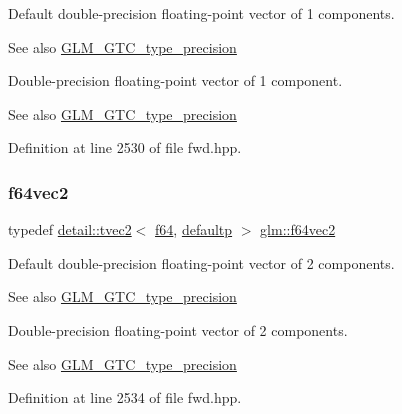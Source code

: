 Default double-\/precision floating-\/point vector of 1 components. \begin{DoxySeeAlso}{See also}
\hyperlink{group__gtc__type__precision}{G\+L\+M\+\_\+\+G\+T\+C\+\_\+type\+\_\+precision}
\end{DoxySeeAlso}
Double-\/precision floating-\/point vector of 1 component. \begin{DoxySeeAlso}{See also}
\hyperlink{group__gtc__type__precision}{G\+L\+M\+\_\+\+G\+T\+C\+\_\+type\+\_\+precision} 
\end{DoxySeeAlso}


Definition at line 2530 of file fwd.\+hpp.

\mbox{\label{group__gtc__type__precision_ga3f131d462df8154918f93ba1ac7cc4bd}} 
\subsubsection{\texorpdfstring{f64vec2}{f64vec2}}
{\footnotesize\ttfamily typedef \hyperlink{structglm_1_1detail_1_1tvec2}{detail\+::tvec2}$<$ \hyperlink{group__gtc__type__precision_ga2bba392e555124b36cde6abba349bab3}{f64}, \hyperlink{namespaceglm_a0f04f086094c747d227af4425893f545a9d21ccd8b5a009ec7eb7677befc3bf51}{defaultp} $>$ \hyperlink{group__gtc__type__precision_ga3f131d462df8154918f93ba1ac7cc4bd}{glm\+::f64vec2}}

Default double-\/precision floating-\/point vector of 2 components. \begin{DoxySeeAlso}{See also}
\hyperlink{group__gtc__type__precision}{G\+L\+M\+\_\+\+G\+T\+C\+\_\+type\+\_\+precision}
\end{DoxySeeAlso}
Double-\/precision floating-\/point vector of 2 components. \begin{DoxySeeAlso}{See also}
\hyperlink{group__gtc__type__precision}{G\+L\+M\+\_\+\+G\+T\+C\+\_\+type\+\_\+precision} 
\end{DoxySeeAlso}


Definition at line 2534 of file fwd.\+hpp.

\mbox{\label{group__gtc__type__precision_ga794ee8f0a105cda01946cd9860f492a8}} 
